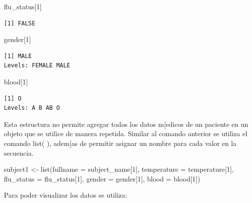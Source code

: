 \documentclass[
  letterpaper,
  DIV=11,
  numbers=noendperiod]{scrartcl}
\newenvironment{Shaded}{\begin{snugshade}}{\end{snugshade}}
\newcommand{\AttributeTok}[1]{\textcolor[rgb]{0.40,0.45,0.13}{#1}}
\newcommand{\DecValTok}[1]{\textcolor[rgb]{0.68,0.00,0.00}{#1}}
\newcommand{\FunctionTok}[1]{\textcolor[rgb]{0.28,0.35,0.67}{#1}}
\newcommand{\NormalTok}[1]{\textcolor[rgb]{0.00,0.23,0.31}{#1}}
\newcommand{\OtherTok}[1]{\textcolor[rgb]{0.00,0.23,0.31}{#1}}
\newcommand{\SpecialCharTok}[1]{\textcolor[rgb]{0.37,0.37,0.37}{#1}}
\begin{document}
\begin{Shaded}
\begin{Highlighting}[]
\NormalTok{flu\_status[}\DecValTok{1}\NormalTok{]}
\end{Highlighting}
\end{Shaded}

\begin{verbatim}
[1] FALSE
\end{verbatim}

\begin{Shaded}
\begin{Highlighting}[]
\NormalTok{gender[}\DecValTok{1}\NormalTok{]}
\end{Highlighting}
\end{Shaded}

\begin{verbatim}
[1] MALE
Levels: FEMALE MALE
\end{verbatim}

\begin{Shaded}
\begin{Highlighting}[]
\NormalTok{blood[}\DecValTok{1}\NormalTok{]}
\end{Highlighting}
\end{Shaded}

\begin{verbatim}
[1] O
Levels: A B AB O
\end{verbatim}

Esta estructura no permite agregar todos los datos m{[}edicos de un
paciente en un objeto que se utilice de manera repetida. Similar al
comando anterior se utiliza el comando list( ), adem{[}as de permitir
asignar un nombre para cada valor en la secuencia.

\begin{Shaded}
\begin{Highlighting}[]
\NormalTok{subject1 }\OtherTok{\textless{}{-}} \FunctionTok{list}\NormalTok{(}\AttributeTok{fullname =}\NormalTok{ subject\_name[}\DecValTok{1}\NormalTok{],}
\AttributeTok{temperature =}\NormalTok{ temperature[}\DecValTok{1}\NormalTok{],}
\AttributeTok{flu\_status =}\NormalTok{ flu\_status[}\DecValTok{1}\NormalTok{],}
\AttributeTok{gender =}\NormalTok{ gender[}\DecValTok{1}\NormalTok{],}
\AttributeTok{blood =}\NormalTok{ blood[}\DecValTok{1}\NormalTok{])}
\end{Highlighting}
\end{Shaded}

Para poder visualizar los datos se utiliza:

\begin{Shaded}
\end{Shaded}
\end{document}
